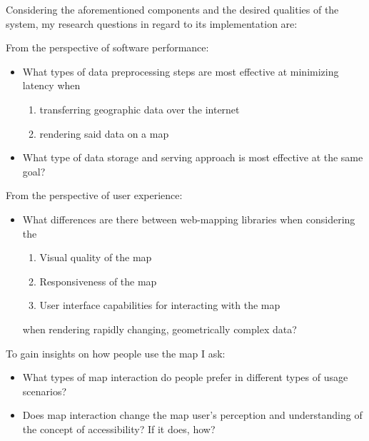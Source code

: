 

Considering the aforementioned components
and the desired qualities of the system,
my research questions in regard to its implementation are:

From the perspective of software performance:
\begin{itemize}
	\item What types of data preprocessing steps are most effective at minimizing
	latency when
	\begin{enumerate}
		\item transferring geographic data over the internet
		\item rendering said data on a map
	\end{enumerate}
	\item What type of data storage and serving approach is most effective at the same goal?
\end{itemize}

From the perspective of user experience:
\begin{itemize}
	\item What differences are there between web-mapping libraries when considering the
	\begin{enumerate}
		\item Visual quality of the map
		\item Responsiveness of the map
		\item User interface capabilities for interacting with the map
	\end{enumerate}
	when rendering rapidly changing, geometrically complex data?
\end{itemize}

To gain insights on how people use the map I ask:  %

\begin{itemize}
	\item What types of map interaction do people prefer in different types of usage scenarios?
	\item Does map interaction change the map user's perception and understanding of the concept of accessibility? If it does, how?
\end{itemize}


